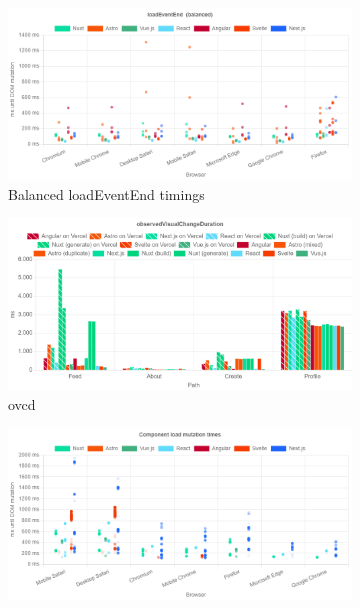 \documentclass[a4paper, 12pt]{article}
\begin{document}
\begin{figure}[!h]
  \centering
  \begin{subfigure}{0.49\linewidth}
    \begin{center}
      \includegraphics[width=\linewidth, keepaspectratio]{img/playwright-results/loadEventEnd_balanced/total.png}
    \end{center}
    \caption{Balanced loadEventEnd timings}
    \label{fig:Playwright:loadEventEnd}
  \end{subfigure}
  \begin{subfigure}{0.49\linewidth}
    \begin{center}
      \includegraphics[width=\linewidth, keepaspectratio]{img/lighthouse-results/olvc-ofvc.png}
    \end{center}
    \caption{\acrfull{ovcd}}
    \label{fig:LH:OVCD}
  \end{subfigure}
  \begin{subfigure}{0.49\linewidth}
    \begin{center}
      \includegraphics[width=\linewidth, keepaspectratio]{img/playwright-results/pageLoadMutations/total.png}

\end{center}
\end{subfigure}
\end{figure}
\end{document}
